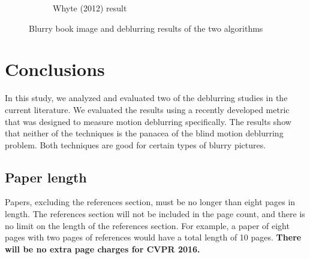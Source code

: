 \documentclass[10pt,twocolumn,letterpaper]{article}
\begin{document}
\begin{figure}
\begin{center}
\begin{subfigure}{0.33\textwidth}
\caption{Whyte \etal (2012) result}
\label{fig:subim3}
\end{subfigure}
 
\caption{Blurry book image and deblurring results of the two algorithms}
\label{fig:image2}
\end{center}
\end{figure}



\section{Conclusions}
In this study, we analyzed and evaluated two of the deblurring studies in the current literature. We evaluated the results using a recently developed metric that was designed to measure motion deblurring specifically. The results show that neither of the techniques is the panacea of the blind motion deblurring problem. Both techniques are good for certain types of blurry pictures.



\subsection{Paper length}
Papers, excluding the references section,
must be no longer than eight pages in length. The references section
will not be included in the page count, and there is no limit on the
length of the references section. For example, a paper of eight pages
with two pages of references would have a total length of 10 pages.
{\bf There will be no extra page charges for
  CVPR 2016.}

\end{document}
